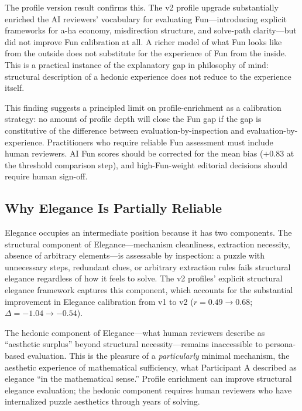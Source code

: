 The profile version result confirms this. The v2 profile upgrade substantially enriched the AI reviewers' vocabulary for evaluating Fun---introducing explicit frameworks for a-ha economy, misdirection structure, and solve-path clarity---but did not improve Fun calibration at all. A richer model of what Fun looks like from the outside does not substitute for the experience of Fun from the inside. This is a practical instance of the explanatory gap in philosophy of mind: structural description of a hedonic experience does not reduce to the experience itself.

This finding suggests a principled limit on profile-enrichment as a calibration strategy: no amount of profile depth will close the Fun gap if the gap is constitutive of the difference between evaluation-by-inspection and evaluation-by-experience. Practitioners who require reliable Fun assessment must include human reviewers. AI Fun scores should be corrected for the mean bias ($+0.83$ at the threshold comparison step), and high-Fun-weight editorial decisions should require human sign-off.

\subsection{Why Elegance Is Partially Reliable}

Elegance occupies an intermediate position because it has two components. The structural component of Elegance---mechanism cleanliness, extraction necessity, absence of arbitrary elements---is assessable by inspection: a puzzle with unnecessary steps, redundant clues, or arbitrary extraction rules fails structural elegance regardless of how it feels to solve. The v2 profiles' explicit structural elegance framework captures this component, which accounts for the substantial improvement in Elegance calibration from v1 to v2 ($r = 0.49 \rightarrow 0.68$; $\Delta = -1.04 \rightarrow -0.54$).

The hedonic component of Elegance---what human reviewers describe as ``aesthetic surplus'' beyond structural necessity---remains inaccessible to persona-based evaluation. This is the pleasure of a \emph{particularly} minimal mechanism, the aesthetic experience of mathematical sufficiency, what Participant A described as elegance ``in the mathematical sense.'' Profile enrichment can improve structural elegance evaluation; the hedonic component requires human reviewers who have internalized puzzle aesthetics through years of solving.

